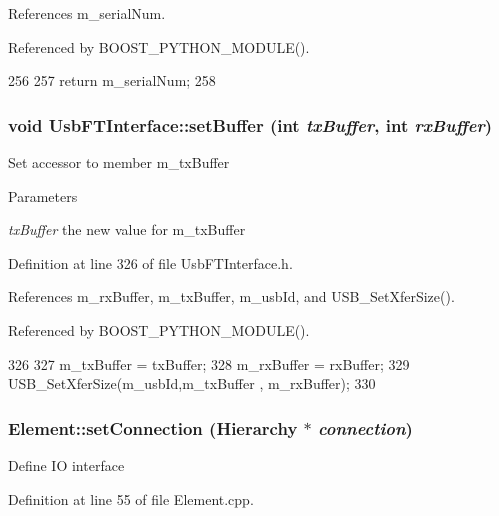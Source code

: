 References m\_\-serialNum.

Referenced by BOOST\_\-PYTHON\_\-MODULE().


\begin{DoxyCode}
256                          {
257     return m_serialNum;
258   }
\end{DoxyCode}
\hypertarget{classUsbFTInterface_aaa09fdc28deb45d0a65f5d42c06dd659}{
\subsubsection[{setBuffer}]{\setlength{\rightskip}{0pt plus 5cm}void UsbFTInterface::setBuffer (int {\em txBuffer}, \/  int {\em rxBuffer})}}
\label{classUsbFTInterface_aaa09fdc28deb45d0a65f5d42c06dd659}
Set accessor to member m\_\-txBuffer 
\begin{DoxyParams}{Parameters}
\item[{\em txBuffer}]the new value for m\_\-txBuffer \end{DoxyParams}


Definition at line 326 of file UsbFTInterface.h.

References m\_\-rxBuffer, m\_\-txBuffer, m\_\-usbId, and USB\_\-SetXferSize().

Referenced by BOOST\_\-PYTHON\_\-MODULE().


\begin{DoxyCode}
326                                               {
327     m_txBuffer = txBuffer;
328     m_rxBuffer = rxBuffer;
329     USB_SetXferSize(m_usbId,m_txBuffer , m_rxBuffer);
330   }
\end{DoxyCode}
\hypertarget{classElement_ab476b4b1df5954141ceb14f072433b89}{
\subsubsection[{setConnection}]{ Element::setConnection ({\bf Hierarchy} $\ast$ {\em connection})}}
\label{classElement_ab476b4b1df5954141ceb14f072433b89}
Define IO interface 

Definition at line 55 of file Element.cpp.

